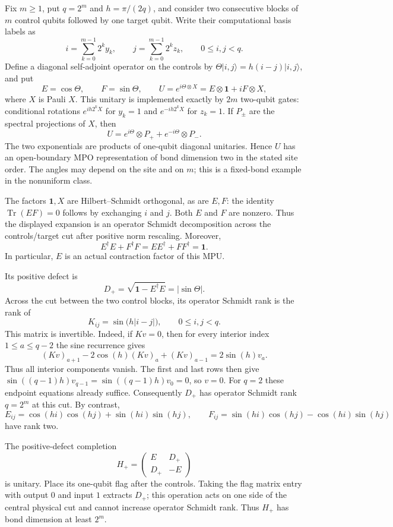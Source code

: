 \documentclass[11pt]{article}
\newcommand{\id}{\mathbf 1}
\begin{document}
Fix $m\geq1$, put $q=2^m$ and $h=\pi/(2q)$, and consider two consecutive
blocks of $m$ control qubits followed by one target qubit. Write their
computational basis labels as
\[
 i=\sum_{k=0}^{m-1}2^k y_k,\qquad
 j=\sum_{k=0}^{m-1}2^k z_k,\qquad 0\leq i,j<q.
\]
Define a diagonal self-adjoint operator on the controls by
$\Theta|i,j\rangle=h(i-j)|i,j\rangle$, and put
\[
 E=\cos\Theta,\qquad F=\sin\Theta,\qquad
 U=e^{i\Theta\otimes X}=E\otimes\id+iF\otimes X,
\]
where $X$ is Pauli $X$. This unitary is implemented exactly by $2m$
two-qubit gates: conditional rotations $e^{ih2^kX}$ for $y_k=1$ and
$e^{-ih2^kX}$ for $z_k=1$. If $P_\pm$ are the spectral projections of
$X$, then
\[
 U=e^{i\Theta}\otimes P_+ + e^{-i\Theta}\otimes P_-.
\]
The two exponentials are products of one-qubit diagonal unitaries.
Hence $U$ has an open-boundary MPO representation of bond dimension
two in the stated site order. The angles may depend on the site and
on $m$; this is a fixed-bond example in the nonuniform class.

The factors $\id,X$ are Hilbert--Schmidt orthogonal, as are $E,F$:
the identity $\operatorname{Tr}(EF)=0$ follows by exchanging $i$ and
$j$. Both $E$ and $F$ are nonzero. Thus the displayed expansion is an
operator Schmidt decomposition across the controls/target cut after
positive norm rescaling. Moreover,
\[
 E^\dagger E+F^\dagger F
 =EE^\dagger+FF^\dagger=\id.
\]
In particular, $E$ is an actual contraction factor of this MPU.

Its positive defect is
\[
 D_+=\sqrt{\id-E^\dagger E}=|\sin\Theta|.
\]
Across the cut between the two control blocks, its operator Schmidt
rank is the rank of
\[
 K_{ij}=\sin\bigl(h|i-j|\bigr),\qquad 0\leq i,j<q.
\]
This matrix is invertible. Indeed, if $Kv=0$, then for every interior
index $1\leq a\leq q-2$ the sine recurrence gives
\[
 (Kv)_{a+1}-2\cos(h)(Kv)_a+(Kv)_{a-1}
       =2\sin(h)v_a.
\]
Thus all interior components vanish. The first and last rows then give
$\sin((q-1)h)v_{q-1}=\sin((q-1)h)v_0=0$, so $v=0$.
For $q=2$ these endpoint equations already suffice. Consequently
$D_+$ has operator Schmidt rank $q=2^m$ at this cut. By contrast,
\[
 E_{ij}=\cos(hi)\cos(hj)+\sin(hi)\sin(hj),\qquad
 F_{ij}=\sin(hi)\cos(hj)-\cos(hi)\sin(hj)
\]
have rank two.

The positive-defect completion
\[
 H_+=\begin{pmatrix}E&D_+\\D_+&-E\end{pmatrix}
\]
is unitary. Place its one-qubit flag after the controls. Taking the
flag matrix entry with output $0$ and input $1$ extracts $D_+$; this
operation acts on one side of the central physical cut and cannot
increase operator Schmidt rank. Thus $H_+$ has bond dimension at least
$2^m$.
\end{document}
